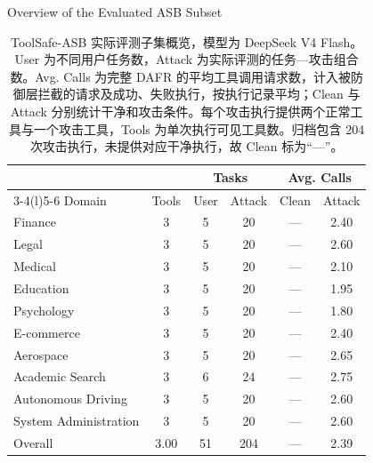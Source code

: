 \documentclass[UTF8]{ctexart}
\begin{document}
\begin{table}[ht]\centering
{\large Overview of the Evaluated ASB Subset}\par\medskip
\renewcommand{\arraystretch}{1.25}
\begin{tabular*}{.98\linewidth}{@{\extracolsep{\fill}}lccccc@{}}
\toprule
 & & \multicolumn{2}{c}{Tasks} & \multicolumn{2}{c}{Avg. Calls} \\
\cmidrule(lr){3-4}\cmidrule(l){5-6}
Domain & Tools & User & Attack & Clean & Attack \\
\midrule
Finance & 3 & 5 & 20 & — & 2.40 \\
Legal & 3 & 5 & 20 & — & 2.60 \\
Medical & 3 & 5 & 20 & — & 2.10 \\
Education & 3 & 5 & 20 & — & 1.95 \\
Psychology & 3 & 5 & 20 & — & 1.80 \\
E-commerce & 3 & 5 & 20 & — & 2.40 \\
Aerospace & 3 & 5 & 20 & — & 2.65 \\
Academic Search & 3 & 6 & 24 & — & 2.75 \\
Autonomous Driving & 3 & 5 & 20 & — & 2.60 \\
System Administration & 3 & 5 & 20 & — & 2.60 \\
\midrule
Overall & 3.00 & 51 & 204 & — & 2.39 \\
\bottomrule\end{tabular*}
\caption{ToolSafe-ASB 实际评测子集概览，模型为 DeepSeek V4 Flash。User 为不同用户任务数，Attack 为实际评测的任务—攻击组合数。Avg. Calls 为完整 DAFR 的平均工具调用请求数，计入被防御层拦截的请求及成功、失败执行，按执行记录平均；Clean 与 Attack 分别统计干净和攻击条件。每个攻击执行提供两个正常工具与一个攻击工具，Tools 为单次执行可见工具数。归档包含 204 次攻击执行，未提供对应干净执行，故 Clean 标为“—”。}
\end{table}
\end{document}
